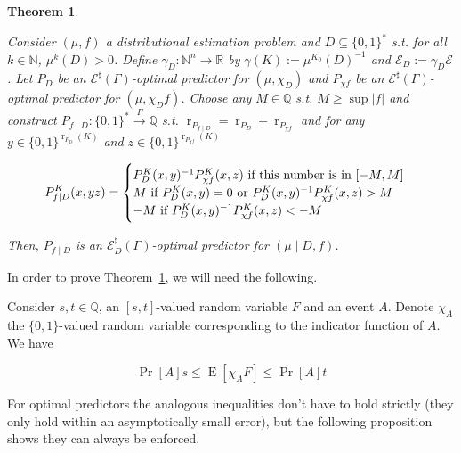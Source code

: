 \documentclass{article}
\numberwithin{equation}{section}
\theoremstyle{definition}
\theoremstyle{plain}
\newtheorem{theorem}{Theorem}[section]
\newcommand{\Bool}{\{0,1\}}
\newcommand{\Words}{{\Bool^*}}
\DeclareMathOperator{\Prb}{Pr}
\DeclareMathOperator{\E}{E}
\DeclareMathOperator{\R}{r}
\newcommand{\Nats}{\mathbb{N}}
\newcommand{\Rats}{\mathbb{Q}}
\newcommand{\Reals}{\mathbb{R}}
\newcommand{\Abs}[1]{\lvert #1 \rvert}
\newcommand{\Fall}{\mathcal{E}}
\newcommand{\ESG}{\Fall^\sharp(\Gamma)}
\newcommand{\BoolR}[1]{\Bool^{\R_{#1}(K)}}
\newcommand{\Scheme}{\xrightarrow{\Gamma}}
\begin{document}
\begin{samepage}
\begin{theorem}
\label{thm:cond}

Consider $(\mu, f)$ a distributional estimation problem and ${D \subseteq \Words}$ s.t. for all $k \in \Nats$, $\mu^k(D) > 0$. Define $\gamma_D: \Nats^n \rightarrow \Reals$ by $\gamma(K):=\mu^{K_0}(D)^{-1}$ and $\Fall_D:=\gamma_D \Fall$. Let $P_D$ be an $\ESG$-optimal predictor for $(\mu, \chi_D)$ and $P_{\chi f}$ be an $\ESG$-optimal predictor for $(\mu, \chi_D f)$. Choose any $M \in \Rats$ s.t. ${M \geq \sup \Abs{f}}$ and construct $P_{f \mid D}: \Words \Scheme \Rats$ s.t. $\R_{P_{f \mid D}} = \R_{P_D} + \R_{P_{\chi f}}$ and for any ${y \in \BoolR{P_D}}$ and $z \in \BoolR{P_{\chi f}}$ 

\begin{equation}
P_{f \mid D}^K(x,yz)=\begin{cases}P_D^K(x,y)^{-1} P_{\chi f}^K(x,z) \textnormal{ if this number is in } [-M,M] \\ M \textnormal{ if } P_D^K(x,y)=0 \textnormal{ or } P_D^K(x,y)^{-1} P_{\chi f}^K(x,z) > M\\ -M \textnormal{ if } P_D^K(x,y)^{-1} P_{\chi f}^K(x,z) < -M\end{cases}
\end{equation}

Then, $P_{f \mid D}$ is an $\Fall_D^\sharp(\Gamma)$-optimal predictor for $(\mu \mid D, f)$.

\end{theorem}
\end{samepage}

In order to prove Theorem~\ref{thm:cond}, we will need the following.

Consider $s,t \in \Rats$, an $[s,t]$-valued random variable $F$ and an event $A$. Denote $\chi_A$ the $\Bool$-valued random variable corresponding to the indicator function of $A$. We have 

\begin{equation}
\Prb[A]s \leq \E[\chi_A F] \leq \Prb[A]t
\end{equation}

For optimal predictors the analogous inequalities don't have to hold strictly (they only hold within an asymptotically small error), but the following proposition shows they can always be enforced.
\end{document}
